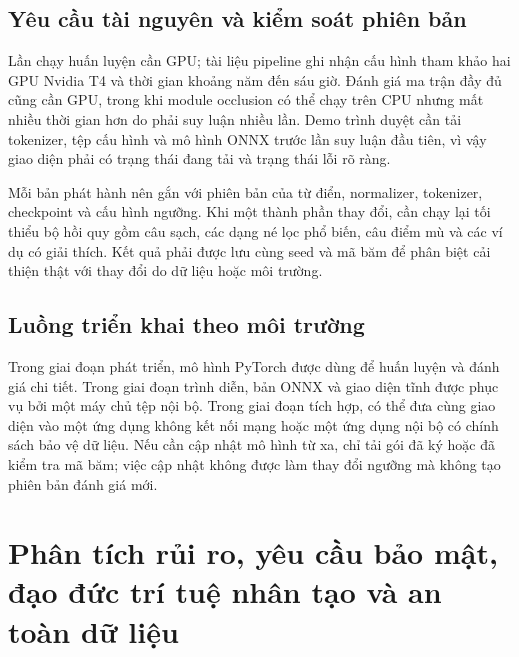 \documentclass[12pt,a4paper]{article}
\begin{document}
\subsection{Yêu cầu tài nguyên và kiểm soát phiên bản}
Lần chạy huấn luyện cần GPU; tài liệu pipeline ghi nhận cấu hình tham khảo hai GPU Nvidia T4 và thời gian khoảng năm đến sáu giờ. Đánh giá ma trận đầy đủ cũng cần GPU, trong khi module occlusion có thể chạy trên CPU nhưng mất nhiều thời gian hơn do phải suy luận nhiều lần. Demo trình duyệt cần tải tokenizer, tệp cấu hình và mô hình ONNX trước lần suy luận đầu tiên, vì vậy giao diện phải có trạng thái đang tải và trạng thái lỗi rõ ràng.

Mỗi bản phát hành nên gắn với phiên bản của từ điển, normalizer, tokenizer, checkpoint và cấu hình ngưỡng. Khi một thành phần thay đổi, cần chạy lại tối thiểu bộ hồi quy gồm câu sạch, các dạng né lọc phổ biến, câu điểm mù và các ví dụ có giải thích. Kết quả phải được lưu cùng seed và mã băm để phân biệt cải thiện thật với thay đổi do dữ liệu hoặc môi trường.

\subsection{Luồng triển khai theo môi trường}
Trong giai đoạn phát triển, mô hình PyTorch được dùng để huấn luyện và đánh giá chi tiết. Trong giai đoạn trình diễn, bản ONNX và giao diện tĩnh được phục vụ bởi một máy chủ tệp nội bộ. Trong giai đoạn tích hợp, có thể đưa cùng giao diện vào một ứng dụng không kết nối mạng hoặc một ứng dụng nội bộ có chính sách bảo vệ dữ liệu. Nếu cần cập nhật mô hình từ xa, chỉ tải gói đã ký hoặc đã kiểm tra mã băm; việc cập nhật không được làm thay đổi ngưỡng mà không tạo phiên bản đánh giá mới.

\section{Phân tích rủi ro, yêu cầu bảo mật, đạo đức trí tuệ nhân tạo và an toàn dữ liệu}
\end{document}
